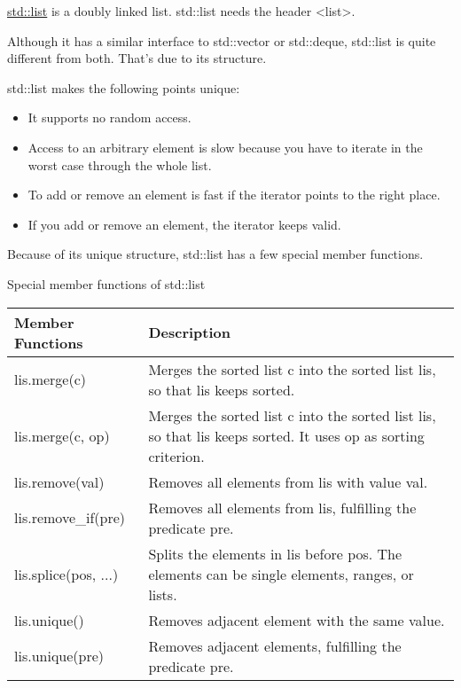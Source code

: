 

\href{http://en.cppreference.com/w/cpp/container/list}{std::list} is a doubly linked list. std::list needs the header <list>.

Although it has a similar interface to std::vector or std::deque, std::list is quite different from both. That’s due to its structure.

std::list makes the following points unique:

\begin{itemize}
\item
It supports no random access.

\item
Access to an arbitrary element is slow because you have to iterate in the worst case through the whole list.

\item
To add or remove an element is fast if the iterator points to the right place.

\item
 If you add or remove an element, the iterator keeps valid.
\end{itemize}

Because of its unique structure, std::list has a few special member functions.


\begin{center}
Special member functions of std::list
\end{center}

\begin{longtable}[c]{|l|l|}
\hline
\textbf{Member Functions} & \textbf{Description}                                                         \\ \hline
\endfirsthead
%
\endhead
%
lis.merge(c)              & Merges the sorted list c into the sorted list lis, so that lis keeps sorted. \\ \hline
lis.merge(c, op)     & Merges the sorted list c into the sorted list lis, so that lis keeps sorted. It uses op as sorting criterion. \\ \hline
lis.remove(val)           & Removes all elements from lis with value val.                                \\ \hline
lis.remove\_if(pre)       & Removes all elements from lis, fulfilling the predicate pre.                 \\ \hline
lis.splice(pos, ...) & Splits the elements in lis before pos. The elements can be single elements, ranges, or lists.                 \\ \hline
lis.unique()              & Removes adjacent element with the same value.                                \\ \hline
lis.unique(pre)           & Removes adjacent elements, fulfilling the predicate pre.                     \\ \hline
\end{longtable}

